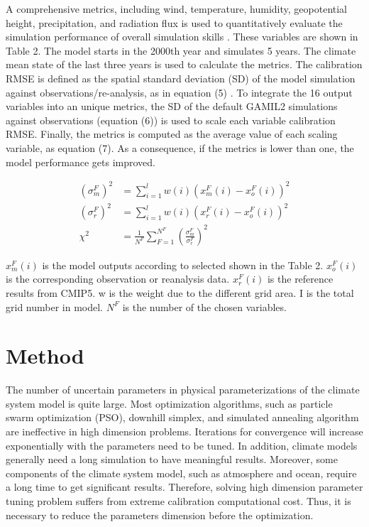 \documentclass[gmd, manuscript]{copernicus}
\begin{document}
A comprehensive metrics, including wind, temperature, humidity, geopotential height, precipitation, and radiation flux is used to quantitatively evaluate the simulation performance of overall simulation skills \citep{murphy2004quantification, gleckler2008performance, reichler2008well}. These variables are shown in Table 2. The model starts in the 2000th year and simulates 5 years. The climate mean state of the last three years is used to calculate the metrics. The calibration RMSE is defined as the spatial standard deviation (SD) of the model simulation against observations/re-analysis, as in equation (5) \citep{taylor2001summarizing,yang2013uncertainty}. To integrate the 16 output variables into an unique metrics, the SD of the default GAMIL2  simulations against observations (equation (6)) is used to scale each variable calibration RMSE. Finally, the  metrics is computed as the average value of each scaling variable, as equation (7). As a consequence, if the metrics is lower than one, the model performance gets improved.


\begin{align}
(\sigma_m^F)^2 &= \sum_{i=1}^l w(i)(x_m^F(i) - x_o^F(i))^2 \\
(\sigma_r^F)^2 &= \sum_{i=1}^l w(i)(x_r^F(i) - x_o^F(i))^2 \\
\chi^2 &= \frac{1}{N^F}\sum_{F=1}^{N^F} (\frac{\sigma_m^F}{\sigma_r^F})^2
\end{align}

$x_m^F(i)$ is the model outputs according to selected shown in the Table 2. $x_o^F(i)$ is the 
corresponding observation or reanalysis data. $x_r^F(i)$ is the reference results from CMIP5. w is 
the weight due to the different grid area. I is the total grid number in model. $N^F$ is the 
number of the chosen variables.


\section{Method}
The number of uncertain parameters in physical parameterizations of the climate system model is quite large. Most optimization algorithms, such as particle swarm optimization (PSO), downhill simplex, and simulated annealing algorithm are ineffective in high dimension problems. Iterations for convergence will increase exponentially with the parameters need to be tuned.  In addition, climate models generally need a long simulation to have meaningful results. Moreover, some components of the climate system model, such as atmosphere and ocean, require a long time to get significant results. Therefore, solving high dimension parameter tuning problem suffers from extreme calibration computational cost.  Thus, it is necessary to reduce the parameters dimension before the optimization.
\end{document}
